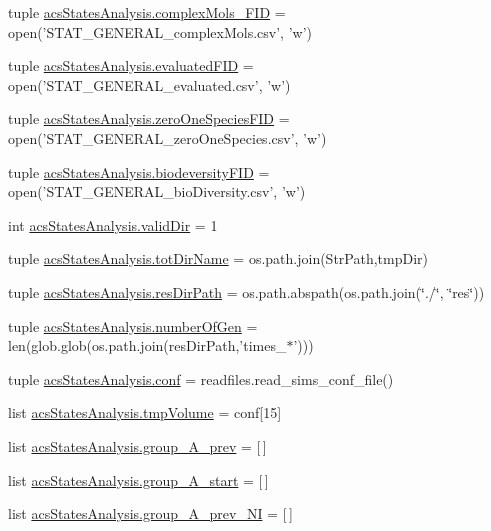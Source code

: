 \begin{DoxyCompactItemize}
tuple \hyperlink{a00132_a2ef28958c50aabe7867b32f8dd6f4ace}{acs\+States\+Analysis.\+complex\+Mols\+\_\+\+F\+I\+D} = open('S\+T\+A\+T\+\_\+\+G\+E\+N\+E\+R\+A\+L\+\_\+complex\+Mols.\+csv', 'w')
\item 
tuple \hyperlink{a00132_a2cc9b964c81489c25978be53ab38eb16}{acs\+States\+Analysis.\+evaluated\+F\+I\+D} = open('S\+T\+A\+T\+\_\+\+G\+E\+N\+E\+R\+A\+L\+\_\+evaluated.\+csv', 'w')
\item 
tuple \hyperlink{a00132_a3dc90aca8a97c5995b013887c98d8ce9}{acs\+States\+Analysis.\+zero\+One\+Species\+F\+I\+D} = open('S\+T\+A\+T\+\_\+\+G\+E\+N\+E\+R\+A\+L\+\_\+zero\+One\+Species.\+csv', 'w')
\item 
tuple \hyperlink{a00132_a68c23cb79e89d9e14acf9ed09f46f0e4}{acs\+States\+Analysis.\+biodeversity\+F\+I\+D} = open('S\+T\+A\+T\+\_\+\+G\+E\+N\+E\+R\+A\+L\+\_\+bio\+Diversity.\+csv', 'w')
\item 
int \hyperlink{a00132_aebb18ab2b73e7e2705ee42c728c0a72b}{acs\+States\+Analysis.\+valid\+Dir} = 1
\item 
tuple \hyperlink{a00132_af4bd99f6cdaec32f48ed0074208b4f0c}{acs\+States\+Analysis.\+tot\+Dir\+Name} = os.\+path.\+join(Str\+Path,tmp\+Dir)
\item 
tuple \hyperlink{a00132_ab3da7da39258338965b6eef645a913ee}{acs\+States\+Analysis.\+res\+Dir\+Path} = os.\+path.\+abspath(os.\+path.\+join(\char`\"{}./\char`\"{}, \char`\"{}res\char`\"{}))
\item 
tuple \hyperlink{a00132_a54acb4eba0735e72c2a820383febd37f}{acs\+States\+Analysis.\+number\+Of\+Gen} = len(glob.\+glob(os.\+path.\+join(res\+Dir\+Path,'times\+\_\+$\ast$')))
\item 
tuple \hyperlink{a00132_ab8d1341009c3207d501833ef63593ffa}{acs\+States\+Analysis.\+conf} = readfiles.\+read\+\_\+sims\+\_\+conf\+\_\+file()
\item 
list \hyperlink{a00132_a1d189b8706c1c2299764d3cfd2ba08d9}{acs\+States\+Analysis.\+tmp\+Volume} = conf\mbox{[}15\mbox{]}
\item 
list \hyperlink{a00132_a1dd2f2c85f697e454c99be1a157d6c17}{acs\+States\+Analysis.\+group\+\_\+\+A\+\_\+prev} = \mbox{[}$\,$\mbox{]}
\item 
list \hyperlink{a00132_a3898175300d001a17a60c23656d2812f}{acs\+States\+Analysis.\+group\+\_\+\+A\+\_\+start} = \mbox{[}$\,$\mbox{]}
\item 
list \hyperlink{a00132_a4d77133a6a303d9486944707f3310cf8}{acs\+States\+Analysis.\+group\+\_\+\+A\+\_\+prev\+\_\+\+N\+I} = \mbox{[}$\,$\mbox{]}
\item 

\end{DoxyCompactItemize}
